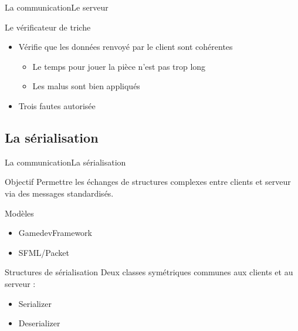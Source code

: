 \documentclass[french]{beamer}
\begin{document}
	\begin{frame}{La communication}{Le serveur}
		\begin{block}{Le vérificateur de triche}
			\begin{itemize}
				\item Vérifie que les données renvoyé par le client sont cohérentes
				\begin{itemize}
					\item Le temps pour jouer la pièce n'est pas trop long
					\item Les malus sont bien appliqués
				\end{itemize}
				\item Trois fautes autorisée
			\end{itemize}
		\end{block}


	\end{frame}
























	\subsection{La sérialisation}

		\begin{frame}{La communication}{La sérialisation}
	        \begin{block}{Objectif}
	            Permettre les échanges de structures complexes entre clients et serveur via des messages standardisés.
	        \end{block}

	        \begin{block}{Modèles}
	            \begin{itemize}
	                \item GamedevFramework
	                \item SFML/Packet
	            \end{itemize}
	        \end{block}

	        \begin{block}{Structures de sérialisation}
	            Deux classes symétriques communes aux clients et au serveur : 
	            \begin{itemize}
	                \item Serializer
	                \item Deserializer
	            \end{itemize}
	        \end{block}     

	    \end{frame}
\end{document}
